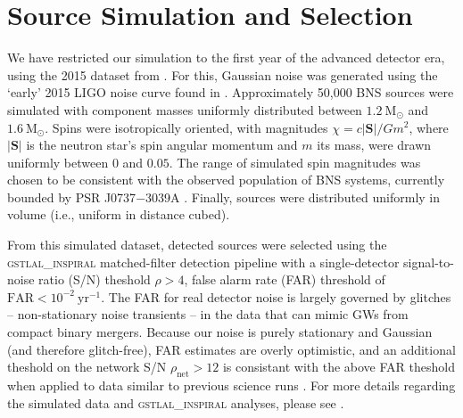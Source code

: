 \section{Source Simulation and Selection}

We have restricted our simulation to the first year of the advanced detector era, using the 2015 dataset from \citet{Singer_2014}.  For this, Gaussian noise was generated using the `early' 2015 LIGO noise curve found in \citet{Barsotti:2012}.  Approximately 50,000 BNS sources were simulated with component masses uniformly distributed between $1.2~\mathrm{M}_\odot$ and $1.6~\mathrm{M}_\odot$.  Spins were isotropically oriented, with magnitudes $\chi = c |\mathbf{S}|/G m^2$, where $|\mathbf{S}|$ is the neutron star's spin angular momentum and $m$ its mass, were drawn uniformly between $0$ and $0.05$.  The range of simulated spin magnitudes was chosen to be consistent with the observed population of BNS systems, currently bounded by PSR J0737$-$3039A \citep{Burgay_2003,Brown_2012}.  Finally, sources were distributed uniformly in volume (i.e., uniform in distance cubed).

From this simulated dataset, detected sources were selected using the \textsc{gstlal\_inspiral} matched-filter detection pipeline \citep{Cannon_2012} with a single-detector signal-to-noise ratio (S/N) theshold $\rho>4$, false alarm rate (FAR) threshold of $\mathrm{FAR}<10^{-2}~\mathrm{yr}^{-1}$.  The FAR for real detector noise is largely governed by glitches -- non-stationary noise transients -- in the data that can mimic GWs from compact binary mergers.  Because our noise is purely stationary and Gaussian (and therefore glitch-free), FAR estimates are overly optimistic, and an additional theshold on the network S/N $\rho_\mathrm{net} > 12$ is consistant with the above FAR theshold when applied to data similar to previous science runs \cite{2013arXiv1304.0670L}.  For more details regarding the simulated data and \textsc{gstlal\_inspiral} analyses, please see \citet{Singer_2014}.